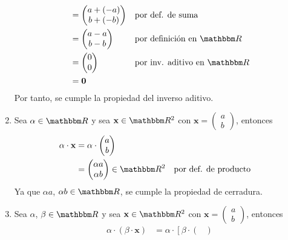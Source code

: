\begin{examplebox}{}{}
\begin{enumerate}[label=\roman*), topsep=6pt, itemsep=0pt]
\begin{align*}
            & = \begin{pmatrix}
                a + (-a) \\
                b + (-b)
            \end{pmatrix} && \text{por def. de suma} \\
            & = \begin{pmatrix}
                a - a \\
                b - b
            \end{pmatrix} && \text{por definición en $\RR$} \\
            & = \begin{pmatrix}
                0 \\
                0
            \end{pmatrix} && \text{por inv. aditivo en $\RR$} \\
            & = \mathbf{0}
        \end{align*}
        Por tanto, se cumple la propiedad del inverso aditivo.
        \item Sea $\alpha \in \RR$ y sea $\mathbf{x} \in \RR[2]$ con $\mathbf{x} = \begin{pmatrix}
            a \\
            b
        \end{pmatrix}$, entonces
        \begin{align*}
            \alpha \cdot \mathbf{x} & = \alpha \cdot \begin{pmatrix}
                a \\
                b
            \end{pmatrix} \\
            & = \begin{pmatrix}
                \alpha a \\
                \alpha b
            \end{pmatrix} \in \RR[2] && \text{por def. de producto}
        \end{align*}
        Ya que $\alpha a$, $\alpha b \in \RR$, se cumple la propiedad de cerradura.
        \item Sea $\alpha$, $\beta \in \RR$ y sea $\mathbf{x} \in \RR[2]$ con $\mathbf{x} = \begin{pmatrix}
            a \\
            b
        \end{pmatrix}$, entonces
        \begin{align*}
            \alpha \cdot (\beta \cdot \mathbf{x}) & = \alpha \cdot \left[ \beta \cdot \begin{pmatrix}

\end{pmatrix}
\end{align*}
\end{enumerate}
\end{examplebox}
